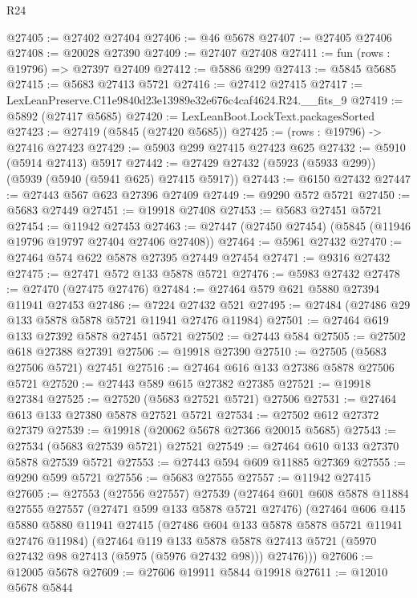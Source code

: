 \begin{lexlean}{R24}
\begin{coremodule}
@27405 := @27402 @27404
@27406 := @46 @5678
@27407 := @27405 @27406
@27408 := @20028 @27390
@27409 := @27407 @27408
@27411 := fun (rows : @19796) => @27397 @27409
@27412 := @5886 @299
@27413 := @5845 @5685
@27415 := @5683 @27413 @5721
@27416 := @27412 @27415
@27417 := LexLeanPreserve.C11e9840d23e13989e32e676c4caf4624.R24.__fits_9
@27419 := @5892 (@27417 @5685)
@27420 := LexLeanBoot.LockText.packagesSorted
@27423 := @27419 (@5845 (@27420 @5685))
@27425 := (rows : @19796) -> @27416 @27423
@27429 := @5903 @299 @27415 @27423 @625
@27432 := @5910 (@5914 @27413) @5917
@27442 := @27429 @27432 (@5923 (@5933 @299)) (@5939 (@5940 (@5941 @625) @27415 @5917))
@27443 := @6150 @27432
@27447 := @27443 @567 @623 @27396 @27409
@27449 := @9290 @572 @5721
@27450 := @5683 @27449
@27451 := @19918 @27408
@27453 := @5683 @27451 @5721
@27454 := @11942 @27453
@27463 := @27447 (@27450 @27454) (@5845 (@11946 @19796 @19797 @27404 @27406 @27408))
@27464 := @5961 @27432
@27470 := @27464 @574 @622 @5878 @27395 @27449 @27454
@27471 := @9316 @27432
@27475 := @27471 @572 @133 @5878 @5721
@27476 := @5983 @27432
@27478 := @27470 (@27475 @27476)
@27484 := @27464 @579 @621 @5880 @27394 @11941 @27453
@27486 := @7224 @27432 @521
@27495 := @27484 (@27486 @29 @133 @5878 @5878 @5721 @11941 @27476 @11984)
@27501 := @27464 @619 @133 @27392 @5878 @27451 @5721
@27502 := @27443 @584
@27505 := @27502 @618 @27388 @27391
@27506 := @19918 @27390
@27510 := @27505 (@5683 @27506 @5721) @27451
@27516 := @27464 @616 @133 @27386 @5878 @27506 @5721
@27520 := @27443 @589 @615 @27382 @27385
@27521 := @19918 @27384
@27525 := @27520 (@5683 @27521 @5721) @27506
@27531 := @27464 @613 @133 @27380 @5878 @27521 @5721
@27534 := @27502 @612 @27372 @27379
@27539 := @19918 (@20062 @5678 @27366 @20015 @5685)
@27543 := @27534 (@5683 @27539 @5721) @27521
@27549 := @27464 @610 @133 @27370 @5878 @27539 @5721
@27553 := @27443 @594 @609 @11885 @27369
@27555 := @9290 @599 @5721
@27556 := @5683 @27555
@27557 := @11942 @27415
@27605 := @27553
    (@27556 @27557)
    @27539
    (@27464
      @601
      @608
      @5878
      @11884
      @27555
      @27557
      (@27471 @599 @133 @5878 @5721 @27476)
      (@27464
        @606
        @415
        @5880
        @5880
        @11941
        @27415
        (@27486 @604 @133 @5878 @5878 @5721 @11941 @27476 @11984)
        (@27464
          @119
          @133
          @5878
          @5878
          @27413
          @5721
          (@5970 @27432 @98 @27413 (@5975 (@5976 @27432 @98)))
          @27476)))
@27606 := @12005 @5678
@27609 := @27606 @19911 @5844 @19918
@27611 := @12010 @5678 @5844

\end{coremodule}
\end{lexlean}

